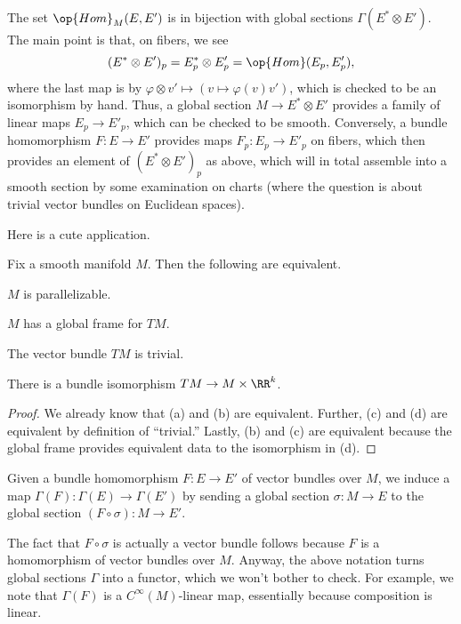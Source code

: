 \documentclass[../notes.tex]{subfiles}
\begin{document}
\begin{remark}
	The set $\op{Hom}_M(E,E')$ is in bijection with global sections $\Gamma(E^*\otimes E')$. The main point is that, on fibers, we see
	\[(E^*\otimes E')_p=E_p^*\otimes E_p'=\op{Hom}(E_p,E_p'),\]
	where the last map is by $\varphi\otimes v'\mapsto(v\mapsto\varphi(v)v')$, which is checked to be an isomorphism by hand. Thus, a global section $M\to E^*\otimes E'$ provides a family of linear maps $E_p\to E'_p$, which can be checked to be smooth. Conversely, a bundle homomorphism $F\colon E\to E'$ provides maps $F_p\colon E_p\to E'_p$ on fibers, which then provides an element of $(E^*\otimes E')_p$ as above, which will in total assemble into a smooth section by some examination on charts (where the question is about trivial vector bundles on Euclidean spaces).
\end{remark}
Here is a cute application.
\begin{lemma}
	Fix a smooth manifold $M$. Then the following are equivalent.
	\begin{listalph}
		\item $M$ is parallelizable.
		\item $M$ has a global frame for $TM$.
		\item The vector bundle $TM$ is trivial.
		\item There is a bundle isomorphism $TM\to M\times\RR^k$.
	\end{listalph}
\end{lemma}
\begin{proof}
	We already know that (a) and (b) are equivalent. Further, (c) and (d) are equivalent by definition of ``trivial.'' Lastly, (b) and (c) are equivalent because the global frame provides equivalent data to the isomorphism in (d).
\end{proof}
\begin{notation}
	Given a bundle homomorphism $F\colon E\to E'$ of vector bundles over $M$, we induce a map $\Gamma(F)\colon\Gamma(E)\to\Gamma(E')$ by sending a global section $\sigma\colon M\to E$ to the global section $(F\circ\sigma)\colon M\to E'$.
\end{notation}
\begin{remark}
	The fact that $F\circ\sigma$ is actually a vector bundle follows because $F$ is a homomorphism of vector bundles over $M$. Anyway, the above notation turns global sections $\Gamma$ into a functor, which we won't bother to check. For example, we note that $\Gamma(F)$ is a $C^\infty(M)$-linear map, essentially because composition is linear.
\end{remark}
\end{document}
